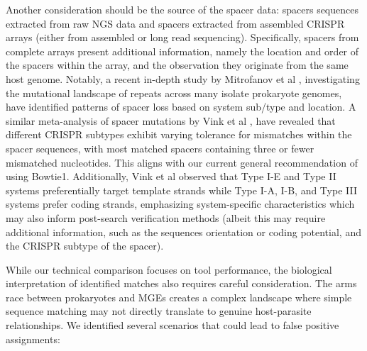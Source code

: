 \documentclass[
]{article}
\begin{document}
Another consideration should be the source of the spacer data: spacers
sequences extracted from raw NGS data and spacers extracted from
assembled CRISPR arrays (either from assembled or long read sequencing).
Specifically, spacers from complete arrays present additional
information, namely the location and order of the spacers within the
array, and the observation they originate from the same host genome.
Notably, a recent in-depth study by Mitrofanov et al
\textcite{Mitrofanov2025}, investigating the mutational landscape of
repeats across many isolate prokaryote genomes, have identified patterns
of spacer loss based on system sub/type and location. A similar
meta-analysis of spacer mutations by Vink et al \textcite{Vink2021},
have revealed that different CRISPR subtypes exhibit varying tolerance
for mismatches within the spacer sequences, with most matched spacers
containing three or fewer mismatched nucleotides. This aligns with our
current general recommendation of using Bowtie1. Additionally, Vink et
al observed that Type I-E and Type II systems preferentially target
template strands while Type I-A, I-B, and Type III systems prefer coding
strands, emphasizing system-specific characteristics which may also
inform post-search verification methods (albeit this may require
additional information, such as the sequences orientation or coding
potential, and the CRISPR subtype of the spacer).

While our technical comparison focuses on tool performance, the
biological interpretation of identified matches also requires careful
consideration. The arms race between prokaryotes and MGEs creates a
complex landscape where simple sequence matching may not directly
translate to genuine host-parasite relationships. We identified several
scenarios that could lead to false positive assignments:
\end{document}
